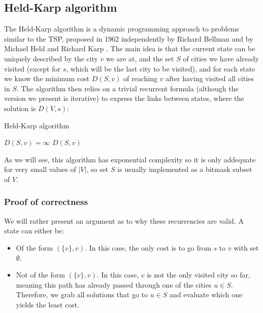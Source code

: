 \subsection{Held-Karp algorithm} \label{algorithm-tsp-heldkarp}
The Held-Karp algorithm is a \gls{dynamic programming} approach to problems similar to the \acrlong*{TSP}, proposed in 1962 independently by Richard Bellman \cite{bellman62} and by Michael Held and Richard Karp \cite{held-karp62}. The main idea is that the current state can be uniquely described by the city $v$ we are at, and the set $S$ of cities we have already visited (except for $s$, which will be the last city to be visited), and for each state we know the minimum cost $D(S,v)$ of reaching $v$ after having visited all cities in $S$. The algorithm then relies on a trivial recurrent formula (although the version we present is \gls{iterative}) to express the links between states, where the solution is $D(V, s)$:
\begin{algorithm}[H]
    \caption{Held-Karp algorithm}
    \label{alg:held-karp}
    \begin{algorithmic}[1]
         {$D(S,v)=\infty$}
        \EndFor
             \Return $D(S,v)$
            \EndIf
              
            \EndIf
                 
            \EndFor
            \State {}
        \EndFunction
    \end{algorithmic}
\end{algorithm}
As we will see, this algorithm has exponential complexity so it is only addequate for very small values of $|V|$, so set $S$ is usually implemented as a bitmask subset of $V$.
\subsubsection{Proof of correctness}
We will rather present an argument as to why these recurrencies are valid. A state can either be:
\begin{itemize}
    \item Of the form $(\{v\}, v)$. In this case, the only cost is to go from $s$ to $v$ with set $\emptyset$.
    \item Not of the form $(\{v\}, v)$. In this case, $v$ is not the only visited city so far, meaning this path has already passed through one of the cities $u \in S$. Therefore, we grab all solutions that go to $u \in S$ and evaluate which one yields the least cost.
\end{itemize}
